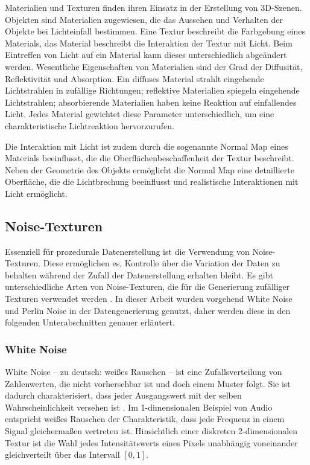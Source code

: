 Materialien und Texturen finden ihren Einsatz in der Erstellung von 3D-Szenen. Objekten sind Materialien zugewiesen, die das Aussehen und Verhalten der Objekte bei Lichteinfall bestimmen. Eine Textur beschreibt die Farbgebung eines Materials, das Material beschreibt die Interaktion der Textur mit Licht. Beim Eintreffen von Licht auf ein Material kann dieses unterschiedlich abgeändert werden. Wesentliche Eigenschaften von Materialien sind der Grad der Diffusität, Reflektivität und Absorption. Ein diffuses Material strahlt eingehende Lichtstrahlen in zufällige Richtungen; reflektive Materialien spiegeln eingehende Lichtstrahlen; absorbierende Materialien haben keine Reaktion auf einfallendes Licht. Jedes Material gewichtet diese Parameter unterschiedlich, um eine charakteristische Lichtreaktion hervorzurufen.

Die Interaktion mit Licht ist zudem durch die sogenannte Normal Map eines Materials beeinflusst, die die Oberflächenbeschaffenheit der Textur beschreibt. Neben der Geometrie des Objekts ermöglicht die Normal Map eine detaillierte Oberfläche, die die Lichtbrechung beeinflusst und realistische Interaktionen mit Licht ermöglicht.


\subsection{Noise-Texturen}
\label{sec:noise}

Essenziell für prozedurale Datenerstellung ist die Verwendung von Noise-Texturen. Diese ermöglichen es, Kontrolle über die Variation der Daten zu behalten während der Zufall der Datenerstellung erhalten bleibt. Es gibt unterschiedliche Arten von Noise-Texturen, die für die Generierung zufälliger Texturen verwendet werden \cite{noise_generation}. In dieser Arbeit wurden vorgehend White Noise und Perlin Noise in der Datengenerierung genutzt, daher werden diese in den folgenden Unterabschnitten genauer erläutert.

\subsubsection{White Noise}

White Noise -- zu deutsch: weißes Rauschen -- ist eine Zufallsverteilung von Zahlenwerten, die nicht vorhersehbar ist und doch einem Muster folgt. Sie ist dadurch charakterisiert, dass jeder Ausgangswert mit der selben Wahrscheinlichkeit versehen ist \cite{white_noise}. Im 1-dimensionalen Beispiel von Audio entspricht weißes Rauschen der Charakteristik, dass jede Frequenz in einem Signal gleichermaßen vertreten ist. Hinsichtlich einer diskreten 2-dimensionalen Textur ist die Wahl jedes Intensitätswerts eines Pixels unabhängig voneinander gleichverteilt über das Intervall $[0, 1]$.

